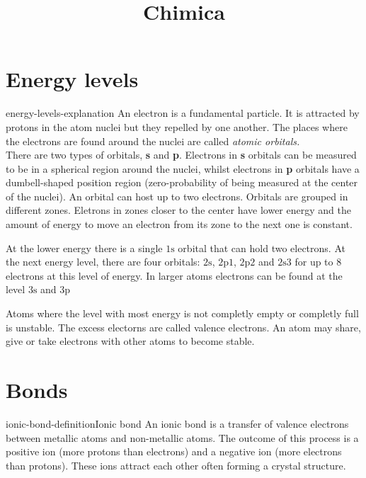 \documentclass[preview]{standalone}
\begin{document}
\title{Chimica}
\genpage

\section{Energy levels}

\begin{snippet}{energy-levels-explanation}
An electron is a fundamental particle. It is attracted by protons in the
atom nuclei but they repelled by one another.
The places where the electrons are found around the nuclei are called
\textit{atomic orbitals.} \\
There are two types of orbitals, \textbf{s} and \textbf{p}.
Electrons in \textbf{s} orbitals can be measured to be in a spherical region around the nuclei,
whilst electrons in \textbf{p} orbitals have a dumbell-shaped position region
(zero-probability of being measured at the center of the nuclei).
An orbital can host up to two electrons.
Orbitals are grouped in different zones.
Eletrons in zones closer to the center have lower energy and the amount of energy
to move an electron from its zone to the next one is constant.

At the lower energy there is a single \(1\text{s}\) orbital that can hold two electrons.
At the next energy level, there are four orbitals:
\(2\text{s}\), \(2\text{p}1\), \(2\text{p}2\) and \(2\text{s}3\) for up to 8 electrons at this level of energy.
In larger atoms electrons can be found at the level \(3\text{s}\) and \(3\text{p}\)

Atoms where the level with most energy is not completly empty or completly full is unstable.
The excess electorns are called valence electrons. An atom may share, give or take electrons
with other atoms to become stable.
\end{snippet}

\section{Bonds}

\begin{snippetdefinition}{ionic-bond-definition}{Ionic bond}
    An ionic bond is a transfer of valence electrons between metallic atoms and non-metallic atoms.
    The outcome of this process is a positive ion (more protons than electrons)
    and a negative ion (more electrons than protons). These ions attract each other often
    forming a crystal structure.
\end{snippetdefinition}
\end{document}
